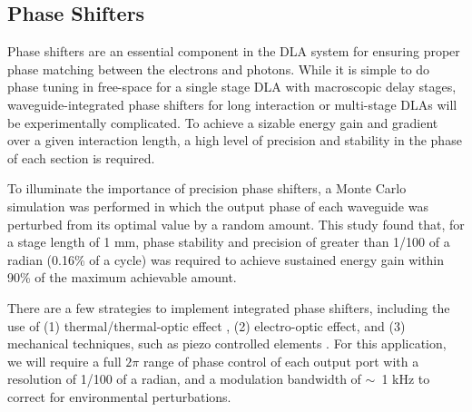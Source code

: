 \subsection{Phase Shifters}
Phase shifters are an essential component in the DLA system for ensuring proper phase matching between the electrons and photons.
While it is simple to do phase tuning in free-space for a single stage DLA with macroscopic delay stages, waveguide-integrated phase shifters for long interaction or multi-stage DLAs will be experimentally complicated.
To achieve a sizable energy gain and gradient over a given interaction length, a high level of precision and stability in the phase of each section is required.

To illuminate the importance of precision phase shifters, a Monte Carlo simulation was performed in which the output phase of each waveguide was perturbed from its optimal value by a random amount.
This study found that, for a stage length of 1 mm, phase stability and precision of greater than 1/100 of a radian (0.16\% of a cycle) was required to achieve sustained energy gain within 90\% of the maximum achievable amount.

There are a few strategies to implement integrated phase shifters, including the use of (1) thermal/thermal-optic effect \cite{kwong20111,kwong2014chip}, (2) electro-optic effect, and (3) mechanical techniques, such as piezo controlled elements \cite{poot2014broadband}.
For this application, we will require a full $2\pi$ range of phase control of each output port with a resolution of 1/100 of a radian, and a modulation bandwidth of $\sim$~1 kHz to correct for environmental perturbations.





